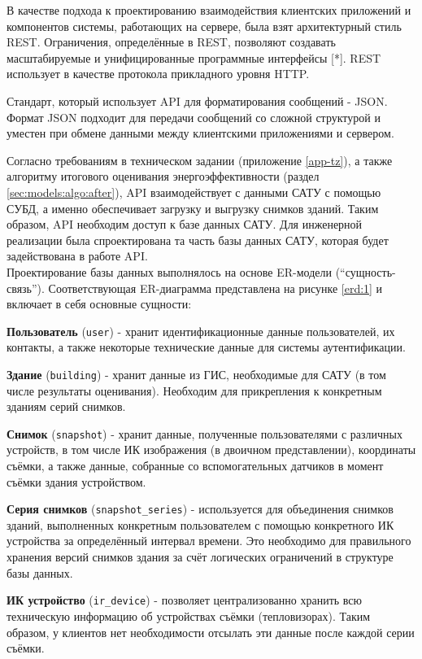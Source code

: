 	В качестве подхода к проектированию взаимодействия клиентских приложений и компонентов системы, работающих на сервере, была взят архитектурный стиль REST. Ограничения, определённые в REST, позволяют создавать масштабируемые и унифицированные программные интерфейсы [*]. REST использует в качестве протокола прикладного уровня HTTP.
	
	Стандарт, который использует API для форматирования сообщений - JSON. Формат JSON подходит для передачи сообщений со сложной структурой и уместен при обмене данными между клиентскими приложениями и сервером.
	
	Согласно требованиям в техническом задании (приложение \ref{app-tz}), а также алгоритму итогового оценивания энергоэффективности (раздел \ref{sec:models:algo:after}), API взаимодействует с данными САТУ с помощью СУБД, а именно обеспечивает загрузку и выгрузку снимков зданий. Таким образом, API необходим доступ к базе данных САТУ. Для инженерной реализации была спроектирована та часть базы данных САТУ, которая будет задействована в работе API. \\

	Проектирование базы данных выполнялось на основе ER-модели (“сущность-связь”). Соответствующая ER-диаграмма представлена на рисунке \ref{erd:1} и включает в себя основные сущности:

	\textbf{Пользователь} (\texttt{user}) - хранит идентификационные данные пользователей, их контакты, а также некоторые технические данные для системы аутентификации.

	\textbf{Здание} (\texttt{building}) - хранит данные из ГИС, необходимые для САТУ (в том числе результаты оценивания). Необходим для прикрепления к конкретным зданиям серий снимков.

	\textbf{Снимок} (\texttt{snapshot}) - хранит данные, полученные пользователями с различных устройств, в том числе ИК изображения (в двоичном представлении), координаты съёмки, а также данные, собранные со вспомогательных датчиков в момент съёмки здания устройством.

	\textbf{Серия снимков} (\texttt{snapshot\_series}) - используется для объединения снимков зданий, выполненных конкретным пользователем с помощью конкретного ИК устройства за определённый интервал времени. Это необходимо для правильного хранения версий снимков здания за счёт логических ограничений в структуре базы данных. 

	\textbf{ИК устройство} (\texttt{ir\_device}) - позволяет централизованно хранить всю техническую информацию об устройствах съёмки (тепловизорах). Таким образом, у клиентов нет необходимости отсылать эти данные после каждой серии съёмки.


